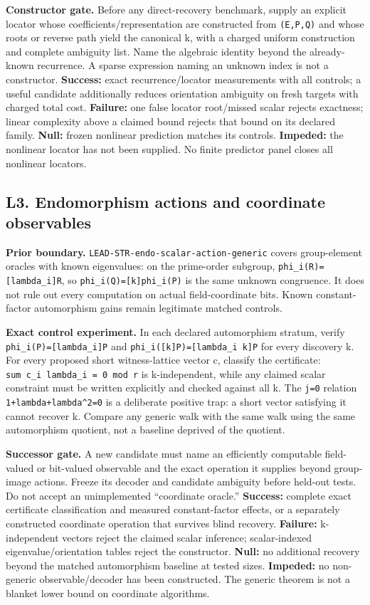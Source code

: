 \documentclass[
  10pt,
]{article}
\begin{document}
\textbf{Constructor gate.} Before any direct-recovery benchmark, supply
an explicit locator whose coefficients/representation are constructed
from \texttt{(E,P,Q)} and whose roots or reverse path yield the
canonical k, with a charged uniform construction and complete ambiguity
list. Name the algebraic identity beyond the already-known recurrence. A
sparse expression naming an unknown index is not a constructor.
\textbf{Success:} exact recurrence/locator measurements with all
controls; a useful candidate additionally reduces orientation ambiguity
on fresh targets with charged total cost. \textbf{Failure:} one false
locator root/missed scalar rejects exactness; linear complexity above a
claimed bound rejects that bound on its declared family. \textbf{Null:}
frozen nonlinear prediction matches its controls. \textbf{Impeded:} the
nonlinear locator has not been supplied. No finite predictor panel
closes all nonlinear locators.

\subsection{L3. Endomorphism actions and coordinate
observables}\label{l3.-endomorphism-actions-and-coordinate-observables}

\textbf{Prior boundary.} \texttt{LEAD-STR-endo-scalar-action-generic}
covers group-element oracles with known eigenvalues: on the prime-order
subgroup, \texttt{phi\_i(R)={[}lambda\_i{]}R}, so
\texttt{phi\_i(Q)={[}k{]}phi\_i(P)} is the same unknown congruence. It
does not rule out every computation on actual field-coordinate bits.
Known constant-factor automorphism gains remain legitimate matched
controls.

\textbf{Exact control experiment.} In each declared automorphism
stratum, verify \texttt{phi\_i(P)={[}lambda\_i{]}P} and
\texttt{phi\_i({[}k{]}P)={[}lambda\_i\ k{]}P} for every discovery k. For
every proposed short witness-lattice vector c, classify the certificate:
\texttt{sum\ c\_i\ lambda\_i\ =\ 0\ mod\ r} is k-independent, while any
claimed scalar constraint must be written explicitly and checked against
all k. The \texttt{j=0} relation \texttt{1+lambda+lambda\^{}2=0} is a
deliberate positive trap: a short vector satisfying it cannot recover k.
Compare any generic walk with the same walk using the same automorphism
quotient, not a baseline deprived of the quotient.

\textbf{Successor gate.} A new candidate must name an efficiently
computable field-valued or bit-valued observable and the exact operation
it supplies beyond group-image actions. Freeze its decoder and candidate
ambiguity before held-out tests. Do not accept an unimplemented
``coordinate oracle.'' \textbf{Success:} complete exact certificate
classification and measured constant-factor effects, or a separately
constructed coordinate operation that survives blind recovery.
\textbf{Failure:} k-independent vectors reject the claimed scalar
inference; scalar-indexed eigenvalue/orientation tables reject the
constructor. \textbf{Null:} no additional recovery beyond the matched
automorphism baseline at tested sizes. \textbf{Impeded:} no non-generic
observable/decoder has been constructed. The generic theorem is not a
blanket lower bound on coordinate algorithms.
\end{document}
